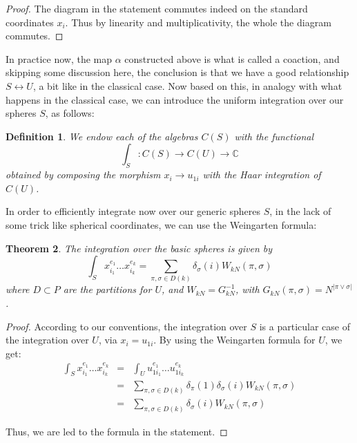 \documentclass[12pt]{amsbook}
\newtheorem{theorem}{Theorem}[chapter]
\newtheorem{definition}[theorem]{Definition}
\begin{document}
\begin{proof}
The diagram in the statement commutes indeed on the standard coordinates $x_i$. Thus by linearity and multiplicativity, the whole the diagram commutes.
\end{proof}

In practice now, the map $\alpha$ constructed above is what is called a coaction, and skipping some discussion here, the conclusion is that we have a good relationship $S\leftrightarrow U$, a bit like in the classical case. Now based on this, in analogy with what happens in the classical case, we can introduce the uniform integration over our spheres $S$, as follows:


\begin{definition}
We endow each of the algebras $C(S)$ with the functional
$$\int_S:C(S)\to C(U)\to\mathbb C$$
obtained by composing the morphism $x_i\to u_{1i}$ with the Haar integration of $C(U)$.
\end{definition}

In order to efficiently integrate now over our generic spheres $S$, in the lack of some trick like spherical coordinates, we can use the Weingarten formula:

 
\begin{theorem}
The integration over the basic spheres is given by
$$\int_Sx_{i_1}^{e_1}\ldots x_{i_k}^{e_k}=\sum_{\pi,\sigma\in D(k)}\delta_\sigma(i)W_{kN}(\pi,\sigma)$$
where $D\subset P$ are the partitions for $U$, and $W_{kN}=G_{kN}^{-1}$, with $G_{kN}(\pi,\sigma)=N^{|\pi\vee\sigma|}$. 
\end{theorem}

\begin{proof}
According to our conventions, the integration over $S$ is a particular case of the integration over $U$, via $x_i=u_{1i}$. By using the Weingarten formula for $U$, we get:
\begin{eqnarray*}
\int_Sx_{i_1}^{e_1}\ldots x_{i_k}^{e_k}
&=&\int_Uu_{1i_1}^{e_1}\ldots u_{1i_k}^{e_k}\\
&=&\sum_{\pi,\sigma\in D(k)}\delta_\pi(1)\delta_\sigma(i)W_{kN}(\pi,\sigma)\\
&=&\sum_{\pi,\sigma\in D(k)}\delta_\sigma(i)W_{kN}(\pi,\sigma)
\end{eqnarray*}

Thus, we are led to the formula in the statement.
\end{proof}
\end{document}
